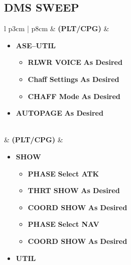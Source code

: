 \documentclass[fontHelvetica]{TechCheck}
\begin{document}
	\subsection{DMS SWEEP}
	\begin{center}
		\begin{longtable}{l p{3cm} | p{8cm}}
			\toprule
			\textbf{\textbullet} &  \textbf{(PLT/CPG)} &
			\begin{minipage}[t]{\linewidth}
				\begin{itemize}
					\item \textbf{ASE--UTIL}
					\begin{itemize}
						\item \textbf{RLWR VOICE} \dotfill \textbf{As Desired}
						\item \textbf{Chaff Settings} \dotfill \textbf{As Desired}
						\item \textbf{CHAFF Mode} \dotfill \textbf{As Desired}
					\end{itemize}
					\item \textbf{AUTOPAGE} \dotfill \textbf{As Desired}
				\end{itemize}
			\end{minipage} \\
			\midrule
			\textbf{\textbullet} &  \textbf{(PLT/CPG)} &
			\begin{minipage}[t]{\linewidth}
				\begin{itemize}
					\item \textbf{SHOW}
					\begin{itemize}
						\item \textbf{PHASE} \dotfill \textbf{Select ATK}
						\item \textbf{THRT SHOW} \dotfill \textbf{As Desired}
						\item \textbf{COORD SHOW} \dotfill \textbf{As Desired}
						\item \textbf{PHASE} \dotfill \textbf{Select NAV}
						\item \textbf{COORD SHOW} \dotfill \textbf{As Desired}
					\end{itemize}
					\item \textbf{UTIL}
					\begin{itemize}

\end{itemize}
\end{itemize}
\end{minipage}
\end{longtable}
\end{center}
\end{document}
